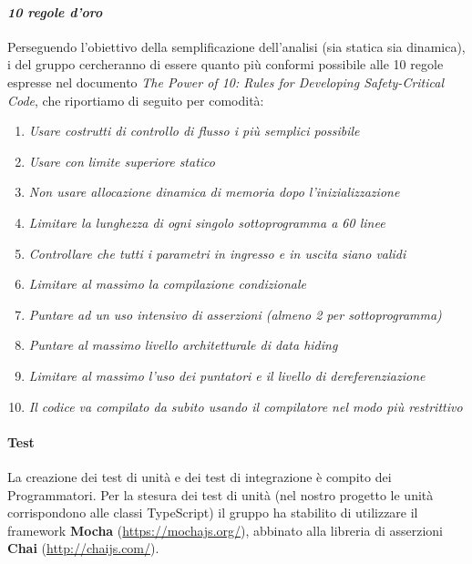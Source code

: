 	
		\paragraph*{\textit{10 regole d'oro}}
		Perseguendo l'obiettivo della semplificazione dell'analisi (sia statica sia dinamica),
           	i  del gruppo cercheranno di essere quanto più conformi possibile alle 10 regole
           	espresse nel documento \textit{The Power of 10: Rules for Developing Safety-Critical Code}, che riportiamo di seguito per comodità:
                	\begin{enumerate}
                        	\item \textit{Usare costrutti di controllo di flusso i più semplici possibile}
                        	\item \textit{Usare  con limite superiore statico}
                        	\item \textit{Non usare allocazione dinamica di memoria dopo l'inizializzazione}
                        	\item \textit{Limitare la lunghezza di ogni singolo sottoprogramma a 60 linee}
                        	\item \textit{Controllare che tutti i parametri in ingresso e in uscita siano validi}
                        	\item \textit{Limitare al massimo la compilazione condizionale}
                        	\item \textit{Puntare ad un uso intensivo di asserzioni (almeno 2 per sottoprogramma)}
                        	\item \textit{Puntare al massimo livello architetturale di \textit{data hiding}}
                        	\item \textit{Limitare al massimo l'uso dei puntatori e il livello di dereferenziazione}
                        	\item \textit{Il codice va compilato da subito usando il compilatore nel modo più restrittivo}
			\end{enumerate}

		\paragraph*{Test}
		La creazione dei test di unità e dei test di integrazione è compito dei Programmatori. Per la stesura dei test di unità
		(nel nostro progetto le unità corrispondono alle classi TypeScript) il gruppo ha stabilito di utilizzare il framework
	        \textbf{Mocha} (\url{https://mochajs.org/}), abbinato alla libreria di asserzioni \textbf{Chai} (\url{http://chaijs.com/}).	

